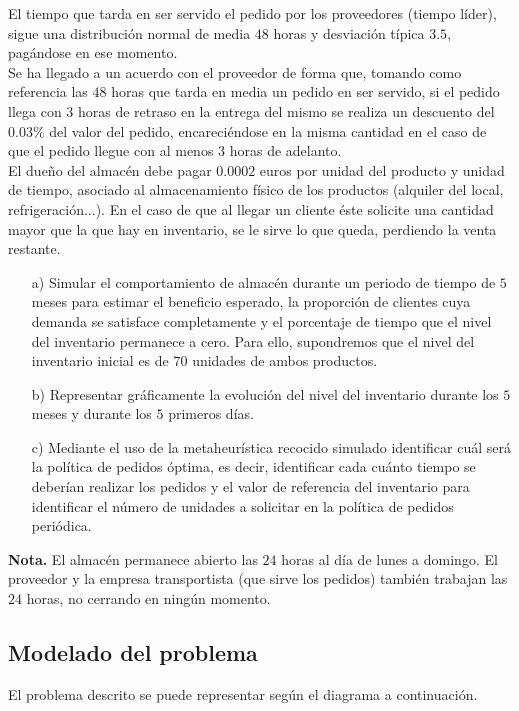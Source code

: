 \documentclass[a4paper,12pt]{article}
\begin{document}
	El tiempo que tarda en ser servido el pedido por los proveedores (tiempo líder), sigue una distribución normal de media 48 horas y desviación típica $3.5$, pagándose en ese momento.\\

	Se ha llegado a un acuerdo con el proveedor de forma que, tomando como referencia las $48$ horas que tarda en media un pedido en ser servido, si el pedido llega con $3$ horas de retraso en la entrega del mismo se realiza un descuento del $0.03\%$ del valor del pedido, encareciéndose en la misma cantidad en el caso de que el pedido llegue con al menos $3$ horas de adelanto.\\
	
	El dueño del almacén debe pagar $0.0002$ euros por unidad del producto y unidad de tiempo, asociado al almacenamiento físico de los productos (alquiler del local, refrigeración...). En el caso de que al llegar un cliente éste solicite una cantidad mayor que la que hay en inventario, se le sirve lo que queda, perdiendo la venta restante.
	
	\begin{enumerate}
		\item[a)] Simular el comportamiento de almacén durante un periodo de tiempo de $5$ meses para estimar el beneficio esperado, la proporción de clientes cuya demanda se satisface completamente y el porcentaje de tiempo que el nivel del inventario permanece a cero. Para ello, supondremos que el nivel del inventario inicial es de $70$ unidades de ambos productos.

		\item[b)] Representar gráficamente la evolución del nivel del inventario durante los $5$ meses y durante los $5$ primeros días. 

		\item[c)] Mediante el uso de la metaheurística recocido simulado identificar cuál será la política de pedidos óptima, es decir, identificar cada cuánto tiempo se deberían realizar los pedidos y el valor de referencia del inventario para identificar el número de unidades a solicitar en la política de pedidos periódica.
	\end{enumerate}
	
	\textbf{Nota.} El almacén permanece abierto las $24$ horas al día de lunes a domingo. El proveedor y la empresa transportista (que sirve los pedidos) también trabajan las $24$ horas, no cerrando en ningún momento.

	\subsection{Modelado del problema}
	El problema descrito se puede representar según el diagrama a continuación.
\end{document}
